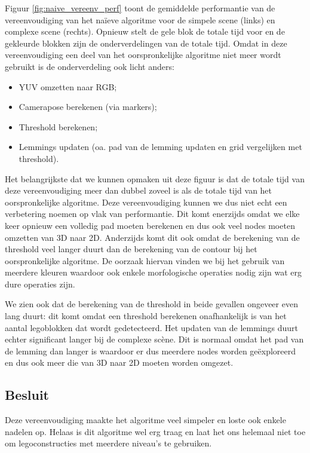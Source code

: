 Figuur \ref{fig:naive_vereenv_perf} toont de gemiddelde performantie van de vereenvoudiging van het na\"ieve algoritme voor de simpele scene (links) en complexe scene (rechts). Opnieuw stelt de gele blok de totale tijd voor en de gekleurde blokken zijn de onderverdelingen van de totale tijd. Omdat in deze vereenvoudiging een deel van het oorspronkelijke algoritme niet meer wordt gebruikt is de onderverdeling ook licht anders:
\begin{itemize}
\item YUV omzetten naar RGB;
\item Camerapose berekenen (via markers);
\item Threshold berekenen;
\item Lemmings updaten (oa. pad van de lemming updaten en grid vergelijken met threshold).
\end{itemize}

Het belangrijkste dat we kunnen opmaken uit deze figuur is dat de totale tijd van deze vereenvoudiging meer dan dubbel zoveel is als de totale tijd van het oorspronkelijke algoritme. Deze vereenvoudiging kunnen we dus niet echt een verbetering noemen op vlak van performantie. Dit komt enerzijds omdat we elke keer opnieuw een volledig pad moeten berekenen en dus ook veel nodes moeten omzetten van 3D naar 2D. Anderzijds komt dit ook omdat de berekening van de threshold veel langer duurt dan de berekening van de contour bij het oorspronkelijke algoritme. De oorzaak hiervan vinden we bij het gebruik van meerdere kleuren waardoor ook enkele morfologische operaties nodig zijn wat erg dure operaties zijn.

We zien ook dat de berekening van de threshold in beide gevallen ongeveer even lang duurt: dit komt omdat een threshold berekenen onafhankelijk is van het aantal legoblokken dat wordt gedetecteerd. Het updaten van de lemmings duurt echter significant langer bij de complexe sc\`ene. Dit is normaal omdat het pad van de lemming dan langer is waardoor er dus meerdere nodes worden ge\"exploreerd en dus ook meer die van 3D naar 2D moeten worden omgezet.

\subsection{Besluit}
Deze vereenvoudiging maakte het algoritme veel simpeler en loste ook enkele nadelen op. Helaas is dit algoritme wel erg traag en laat het ons helemaal niet toe om legoconstructies met meerdere niveau's te gebruiken.

